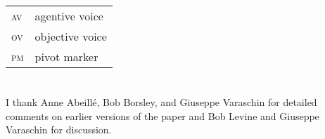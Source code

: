\documentclass[output=paper
 	        ,biblatex
                ,babelshorthands
                ,newtxmath
                ,draftmode
                ,colorlinks, citecolor=brown
]{langscibook}
\begin{document}
\begin{tabularx}{.99\textwidth}{@{}lX}
\textsc{av} & agentive voice\\
\textsc{ov} & objective voice\\
\textsc{pm} & pivot marker\\
\end{tabularx}




\section*{\acknowledgmentsUS}


I thank Anne Abeillé, Bob Borsley, and Giuseppe Varaschin for detailed comments on earlier versions
of the paper and Bob Levine and Giuseppe Varaschin for discussion.








{\sloppy
\printbibliography[heading=subbibliography,notkeyword=this]
}
\end{document}
